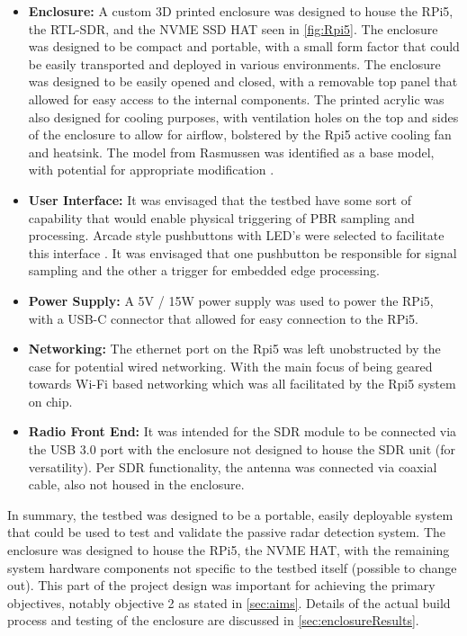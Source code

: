 \begin{itemize}
    \item \textbf{Enclosure:} A custom 3D printed enclosure was designed to house the RPi5, the RTL-SDR, and the NVME SSD HAT seen in \ref{fig:Rpi5}. The enclosure was designed to be compact and portable, with a small form factor that could be easily transported and deployed in various environments. The enclosure was designed to be easily opened and closed, with a removable top panel that allowed for easy access to the internal components. The printed acrylic was also designed for cooling purposes, with ventilation holes on the top and sides of the enclosure to allow for airflow, bolstered by the Rpi5 active cooling fan and heatsink. The model from Rasmussen was identified as a base model, with potential for appropriate modification \cite{RPiCase}. 
    \item \textbf{User Interface:} It was envisaged that the testbed have some sort of capability that would enable physical triggering of PBR sampling and processing. Arcade style pushbuttons with LED's were selected to facilitate this interface \cite{pushbuttons}. It was envisaged that one pushbutton be responsible for signal sampling and the other a trigger for embedded edge processing. 
    \item \textbf{Power Supply:} A 5V / 15W power supply was used to power the RPi5, with a USB-C connector that allowed for easy connection to the RPi5. 
    \item \textbf{Networking:} The ethernet port on the Rpi5 was left unobstructed by the case for potential wired networking. With the main focus of being geared towards Wi-Fi based networking which was all facilitated by the Rpi5 system on chip.
    \item \textbf{Radio Front End:} It was intended for the SDR module to be connected via the USB 3.0 port with the enclosure not designed to house the SDR unit (for versatility). Per SDR functionality, the antenna was connected via coaxial cable, also not housed in the enclosure. 
    
\end{itemize}

In summary, the testbed was designed to be a portable, easily deployable system that could be used to test and validate the passive radar detection system. The enclosure was designed to house the RPi5, the NVME HAT, with the remaining system hardware components not specific to the testbed itself (possible to change out). This part of the project design was important for achieving the primary objectives, notably objective 2 as stated in \ref{sec:aims}. Details of the actual build process and testing of the enclosure are discussed in \ref{sec:enclosureResults}.

